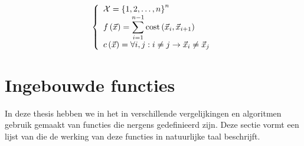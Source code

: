 \subsection{}

\subsection{}

\begin{equation}
\left\{\begin{array}{ll}
\mathcal{X}=\left\{ 1,2,\ldots,n\right\}^n\\
f\left(\vec{x}\right)=\displaystyle\sum_{i=1}^{n-1}\mbox{cost}\left(\vec{x}_i,\vec{x}_{i+1}\right)\\
c\left(\vec{x}\right)=\forall i,j: i\neq j\rightarrow \vec{x}_i\neq\vec{x}_j
\end{array}\right.
\end{equation}

\subsection{}

\subsection{}

\subsection{}

\subsection{}

\subsection{}

\subsection{}

\subsection{}

\section{Ingebouwde functies}

In deze thesis hebben we in het in verschillende vergelijkingen en algoritmen gebruik gemaakt van functies die nergens gedefinieerd zijn. Deze sectie vormt een lijst van die de werking van deze functies in natuurlijke taal beschrijft.